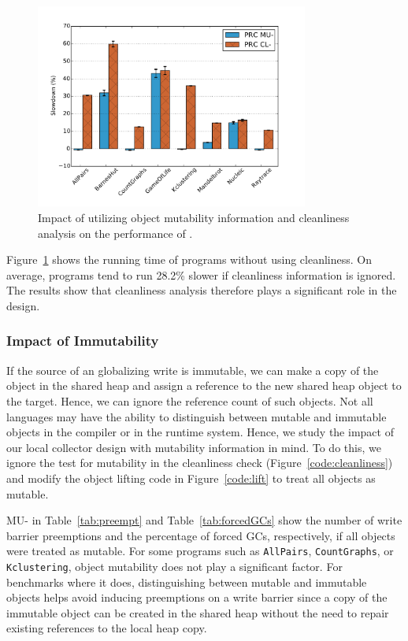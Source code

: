 \begin{figure}[t]
  \centering
  \includegraphics[width=0.8\textwidth]{Graphs/slowdown_cleanliness}
	\caption{Impact of utilizing object mutability information and cleanliness
	analysis on the performance of \prc.}
  \label{fig:slowdown-cleanliness}
\end{figure}

Figure~\ref{fig:slowdown-cleanliness} shows the running time of programs
without using cleanliness. On average, programs tend to run 28.2\% slower if
cleanliness information is ignored. The results show that cleanliness analysis
therefore plays a significant role in the \prc design.

\subsubsection{Impact of Immutability}

If the source of an globalizing write is immutable, we can make a copy of the
object in the shared heap and assign a reference to the new shared heap object
to the target. Hence, we can ignore the reference count of such objects. Not
all languages may have the ability to distinguish between mutable and immutable
objects in the compiler or in the runtime system. Hence, we study the impact of
our local collector design with mutability information in mind.  To do this, we
ignore the test for mutability in the cleanliness check
(Figure~\ref{code:cleanliness}) and modify the object lifting code in
Figure~\ref{code:lift} to treat all objects as mutable.

\prc MU- in Table~\ref{tab:preempt} and Table~\ref{tab:forcedGCs} show the
number of write barrier preemptions and the percentage of forced GCs,
respectively, if all objects were treated as mutable.  For some programs such
as {\tt AllPairs}, {\tt CountGraphs}, or {\tt Kclustering}, object mutability
does not play a significant factor.  For benchmarks where it does,
distinguishing between mutable and immutable objects helps avoid inducing
preemptions on a write barrier since a copy of the immutable object can be
created in the shared heap without the need to repair existing references to
the local heap copy.

